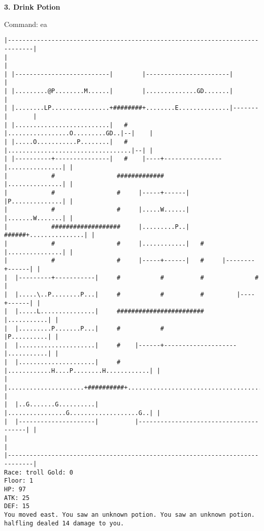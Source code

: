 \documentclass[11pt]{article}
\theoremstyle{plain}
\begin{document}
\newpage
\textbf{3. Drink Potion}

Command: ea
\begin{Verbatim}[fontsize=\scriptsize]
|-----------------------------------------------------------------------------|
|                                                                             |
| |--------------------------|        |-----------------------|               |
| |.........@P........M......|        |..............GD.......|               |
| |........LP................+########+........E..............|-------|       |
| |..........................|   #    |.................O.........GD..|--|    |
| |.....O...........P........|   #    |..................................|--| |
| |----------+---------------|   #    |----+----------------|...............| |
|            #                 #############                |...............| |
|            #                 #     |-----+------|         |P..............| |
|            #                 #     |.....W......|         |.......W.......| |
|            ###################     |.........P..|   ######+...............| |
|            #                 #     |............|   #     |...............| |
|            #                 #     |-----+------|   #     |--------+------| |
|  |---------+-----------|     #           #          #              #        |
|  |.....\..P........P...|     #           #          #         |----+------| |
|  |.....L...............|     ########################         |...........| |
|  |.........P.......P...|     #           #                    |P..........| |
|  |.....................|     #    |------+--------------------|...........| |
|  |.....................|     #    |............H....P........H............| |
|  |.....................+##########+.......................................| |
|  |..G.......G..........|          |................G...................G..| |
|  |---------------------|          |---------------------------------------| |
|                                                                             |
|-----------------------------------------------------------------------------|
Race: troll Gold: 0                                                    Floor: 1
HP: 97
ATK: 25
DEF: 15
You moved east. You saw an unknown potion. You saw an unknown potion. halfling dealed 14 damage to you. 
\end{Verbatim}
\end{document}
